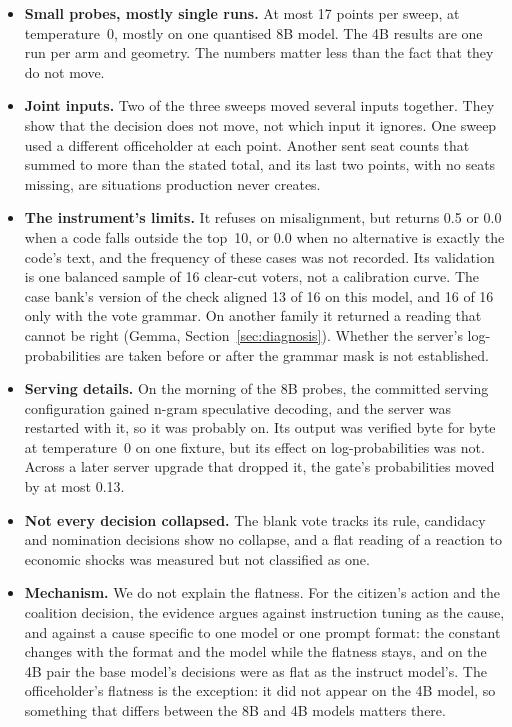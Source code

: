 \documentclass[11pt]{article}
\begin{document}
\begin{itemize}
  \item \textbf{Small probes, mostly single runs.} At most 17 points per sweep, at temperature~0,
    mostly on one quantised 8B model. The 4B results are one run per arm and geometry. The numbers matter less
    than the fact that they do not move.
  \item \textbf{Joint inputs.} Two of the three sweeps moved several inputs together. They show
    that the decision does not move, not which input it ignores. One sweep used a different
    officeholder at each point. Another sent seat counts that summed to more than the stated
    total, and its last two points, with no seats missing, are situations production never
    creates.
  \item \textbf{The instrument's limits.} It refuses on misalignment, but returns 0.5 or 0.0 when
    a code falls outside the top~10, or 0.0 when no alternative is exactly the code's text, and
    the frequency of these cases was not recorded. Its
    validation is one balanced sample of 16 clear-cut voters, not a calibration curve. The case
    bank's version of the check aligned 13 of 16 on this model, and 16 of 16 only with the vote
    grammar. On another family it returned a reading that cannot be right (Gemma, Section~\ref{sec:diagnosis}). Whether
    the server's log-probabilities are taken before or after the grammar mask is not established.
  \item \textbf{Serving details.} On the morning of the 8B probes, the committed serving
    configuration gained n-gram speculative decoding, and the server was restarted with it, so it
    was probably on. Its output was verified byte for byte at temperature~0 on one fixture, but its
    effect on log-probabilities was not. Across a later server upgrade that dropped it, the gate's
    probabilities moved by at most 0.13.
  \item \textbf{Not every decision collapsed.} The blank vote tracks its rule, candidacy and
    nomination decisions show no collapse, and a flat reading of a reaction to economic shocks
    was measured but not classified as one.
  \item \textbf{Mechanism.} We do not explain the flatness. For the citizen's action and the
    coalition decision, the evidence argues against instruction tuning as the cause, and against
    a cause specific to one model or one prompt format: the constant changes with the format and
    the model while the flatness stays, and on the 4B pair the base model's decisions were as
    flat as the instruct model's. The officeholder's flatness is the exception: it did not
    appear on the 4B model, so something that differs between the 8B and 4B models matters
    there.
\end{itemize}
\end{document}
